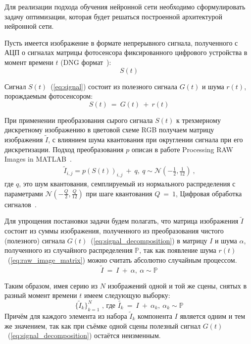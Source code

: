 \documentclass[14pt]{mmcs_article}
\begin{document}
Для реализации подхода обучения нейронной сети необходимо сформулировать задачу оптимизации, которая будет решаться построенной архитектурой нейронной сети. 

Пусть имеется изображение в формате непрерывного сигнала, полученного с АЦП о сигналах матрицы фотосенсора фиксированного цифрового устройства в момент времени $t$ (DNG формат~\autocite{DNG}):
\begin{equation}\label{eq:signal}
S(t)
\end{equation}

Сигнал $S(t)$~(\ref{eq:signal}) состоит из полезного сигнала $G(t)$ и шума $r(t)$, порождаемым фотосенсором:
\begin{equation}\label{eq:signal_decomposition}
S(t)\ =\ G(t)\ +\ r(t)
\end{equation}

При применении преобразования сырого сигнала $S(t)$ к трехмерному дискретному изображению в цветовой схеме RGB получаем матрицу изображения  $\tilde{I}$, с влиянием шума квантования при округлении сигнала при его дискретизации. Подход преобразования $p$ описан в работе Processing RAW Images in MATLAB~\autocite{RAWtoRGB}.
\begin{eqnarray}\label{eq:raw_image_matrix}
\tilde{I}_{i,j} = p(S(t))_{i, j}\ +\ q,\ q  \sim \mathcal{N}(-\frac{1}{2}, \frac{1}{12})\ \text{,}
\end{eqnarray}
где $q$, это шум квантования, семплируемый из нормального распределения с параметрами $\mathcal{N}(-\frac{Q}{2}, \frac{Q}{12})$ при шаге квантования $Q\ =\ 1$, Цифровая обработка сигналов~\autocite{DSP}.

Для упрощения постановки задачи будем полагать, что матрица изображения $\tilde{I}$ состоит из суммы изображения, полученного из преобразования чистого (полезного) сигнала $G(t)$~(\ref{eq:signal_decomposition}) в матрицу $I$ и шума $\alpha$, полученного из случайного распределения $\mathbb{P}$, так как появление шума $r(t)$~(\ref{eq:raw_image_matrix}) можно считать абсолютно случайным процессом.
\begin{equation}\label{eq:matrix_def}
\tilde{I}\ =\ I\ +\ \alpha,\ \alpha \sim \mathbb{P}
\end{equation}

Таким образом, имея серию из $N$ изображений одной и той же сцены, снятых в разный момент времени $t$ имеем следующую выборку:
\begin{equation}\label{eq:collection}
\{\tilde{I}_k\}_{k=1}^{N}\text{ , где }\tilde{I_k}\ =\  I\ +\ \alpha_k,\ \alpha_k \sim \mathbb{P}
\end{equation}
Причём для каждого элемента из набора $\tilde{I}_k$ компонента $I$ является одним и тем же значением, так как при съёмке одной сцены полезный сигнал $G(t)$~(\ref{eq:signal_decomposition}) остаётся неизменным.
\end{document}
